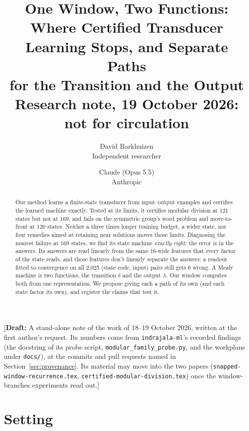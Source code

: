 \documentclass[11pt]{article}
\title{One Window, Two Functions:\\Where Certified Transducer Learning Stops, and Separate Paths\\for the Transition and the Output\\[0.5em]
\large Research note, 19 October 2026: not for circulation}
\author{
  David Barkhuizen\\
  Independent researcher
  \and
  Claude (Opus 5.5)\\
  Anthropic
}
\date{}
\newcommand{\draftnote}[1]{\textcolor{red!70!black}{[\textbf{Draft:} #1]}}
\begin{document}
\maketitle

\draftnote{A stand-alone note of the work of 18--19 October 2026, written at the first author's
request. Its numbers come from \texttt{indrajala-ml}'s recorded findings (the docstring of its
probe script, \texttt{modular\_family\_probe.py}, and the workplans under \texttt{docs/}),
at the commits and pull requests named in Section~\ref{sec:provenance}. Its material may move into
the two papers (\texttt{snapped-window-recurrence.tex}, \texttt{certified-modular-division.tex})
once the window-branches experiments read out.}

\begin{abstract}
Our method learns a finite-state transducer from input--output examples and certifies the learned
machine exactly. Tested at its limits, it certifies modular division at 121 states but not at 169,
and fails on the symmetric group's word problem and move-to-front at 120 states. Neither a three
times longer training budget, a wider state, nor four remedies aimed at retaining near solutions
moves those limits. Diagnosing the nearest failure at 169 states, we find its state machine
\emph{exactly right}: the error is in the answers. Its answers are read linearly from the same
16-wide features that every factor of the state reads, and those features don't linearly separate
the answers: a readout fitted to convergence on all 2{,}025 (state code, input) pairs still gets 6
wrong. A Mealy machine is two functions, the transition $\delta$ and the output $\lambda$. Our
window computes both from one representation. We propose giving each a path of its own (and each
state factor its own), and register the claims that test it.
\end{abstract}

\section{Setting}
\end{document}
